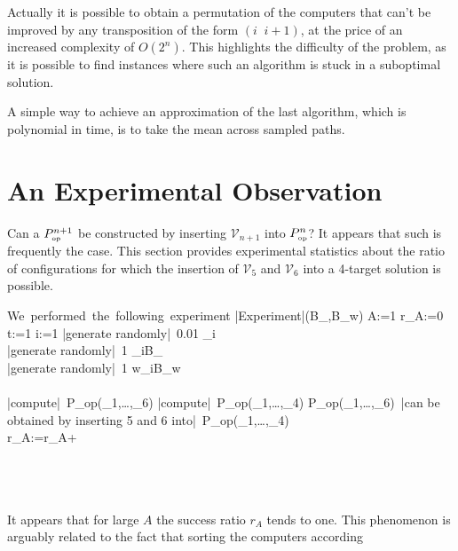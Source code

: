 \documentclass[11pt]{llncs}
\begin{document}
		Actually it is possible to obtain a permutation of the computers that can't be improved by any transposition of the form  $(i\;\; i+1)$, at the price of an increased complexity of $O(2^n)$. This highlights the difficulty of the problem, as it is possible to find instances where such an algorithm is stuck in a suboptimal solution.
		
		A simple way to achieve an approximation of the last algorithm, which is polynomial in time, is to take the mean across sampled paths.
\section{An Experimental Observation}

Can a $P_{\mbox{{\tiny op}}}^{n+1}$ be constructed by inserting $\mathcal{V}_{n+1}$ into $P_{\mbox{{\tiny op}}}^n$? It appears that such is frequently the case. This section provides experimental statistics about the ratio of configurations for which the insertion of $\mathcal{V}_5$ and $\mathcal{V}_6$ into a 4-target solution is possible.

\begin{program}
\mbox{We performed the following experiment}
\PROC |Experiment|(B_\pi,B_w) \BODY
  \FOR A:=1  \DO
   r_A:=0\\
    \FOR t:=1  \DO
    \FOR i:=1  \DO
       |generate randomly|~0.01 \leq \epsilon_i\\
       |generate randomly|~1 \leq \pi_i\leq B_\pi\\
       |generate randomly|~1 \leq w_i\leq B_w \\
    \OD\\
     |compute|~P_{\mbox{{\tiny op}}}(_1,\ldots,_6)
     |compute|~P_{\mbox{{\tiny op}}}(_1,\ldots,_4)
     \IF P_{\mbox{{\tiny op}}}(_1,\ldots,_6)~|can be obtained by inserting 5 and 6 into|~P_{\mbox{{\tiny op}}}(_1,\ldots,_4)\\
     \THEN r_A:=r_A+\\
     \FI\\
     \OD\\
     \OD\\
\end{program}

It appears that for large $A$ the success ratio $r_A$ tends to one. This phenomenon is arguably related to the fact that sorting the computers according %
\end{document}

